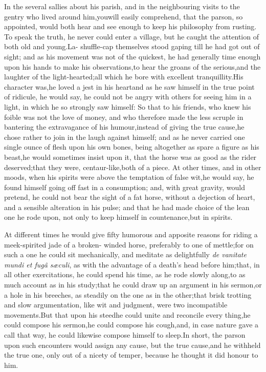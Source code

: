 \documentclass{article}
\begin{document}
In the several sallies about his parish, 
and in the neighbouring visits to the\break
gentry who lived around him,\tsh  you\break will easily
comprehend, that the parson, so appointed, would both hear and see
enough to keep his philosophy from\break
rusting. To speak the truth, he never
could enter a village, but he caught the attention
of both old and young.\tsh  La-\break
{}
\break shuffle-cap themselves
stood gaping till he had got out of sight; and as his\break
movement was
not of the quickest, he had generally time enough upon his\break
hands to make his observations,\tsk  to hear the groans of the
serious,\tsh and the laughter of the light-hearted;\tsk all which he
bore with excellent tranquillity.\tsk  His character was,\tsk  he
loved a jest in his heart\tsk  and as he saw himself in the true
point of ridicule, he would say, he could not be angry with others
for seeing him in a light, in which he so strongly saw himself: So
that to his friends, who knew his foible was not the love of money,
and who therefore made the less scruple in bantering the
extravagance of his humour,\tsk  instead of giving the true
cause,\tsk  he chose rather to join in the laugh against himself;
and as he never carried one single ounce of flesh upon his own bones, being altogether
as spare a figure as his beast,\tsk  he would sometimes insist
upon it, that the horse was as good as the rider
deserved;\tsk  that they were, centaur-like,\tsk  both of a
piece. At other times, and in other moods, when his\break
spirits were above the temptation of false wit,\tsk  he would
say, he found himself going off fast in a consumption; and, with
great gravity, would pretend, he could not bear the sight of a
fat horse, without a dejection of heart, and a sensible
alteration in his pulse; and that he had made choice of the lean
one he rode upon, not only to keep himself in countenance,\break but
in spirits.

At different times he would give fifty humorous and apposite
reasons for riding a meek-spirited jade of a broken-\break 
winded horse,
preferably to one of mettle;\tsk  for on such a one he could sit
mechanically, and meditate as delightfully \textit{de vanitate mundi et
fugâ sæculi}, as with the advantage of a
death’s head before him;\tsk  that, in all other
exercitations, he
could spend his time, as he rode slowly along,\tsk  to as
much account as in his study;\tsk  that he could draw up an
argument in his sermon,\tsk  or a hole in his breeches, as
steadily on the one as in the other;\tsk  that brisk trotting and
slow argumentation, like wit and judgment, were two incompatible
movements.\tsk  But that upon his steed\tsk  he could unite and
reconcile every thing,\tsk  he could compose his sermon,\tsk  he
could compose his cough,\tsh  and, in case nature gave a
call that way, he could likewise compose himself to sleep.\tsk  In
short, the parson upon such encounters would assign any cause, but
the true cause,\tsk  and he with\-held the true one, only out of a
nicety of temper, because he thought it did honour to him.
\end{document}
